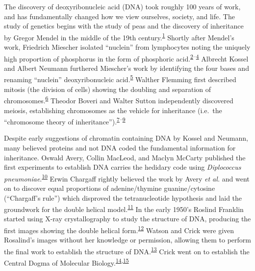 \documentclass[11pt,letterpaper]{book}
\begin{document}
The discovery of deoxyribonucleic acid (DNA) took roughly 100 years of work, and has fundamentally changed how we view ourselves, society, and life.
The study of genetics begins with the study of peas and the discovery of inheritance by Gregor Mendel in the middle of the 19th century.\textsuperscript{\protect\hyperlink{ref-mendel:1866aa}{1}}
Shortly after Mendel's work, Friedrich Miescher isolated ``nuclein'' from lymphocytes noting the uniquely high proportion of phosphorus in the form of phosphoric acid.\textsuperscript{\protect\hyperlink{ref-miescher:1871aa}{2}--\protect\hyperlink{ref-miescher:1874ab}{4}}
Albrecht Kossel and Albert Neumann furthered Miescher's work by identifying the four bases and renaming ``nuclein'' deoxyribonucleic acid.\textsuperscript{\protect\hyperlink{ref-kossel:1893aa}{5}}
Walther Flemming first described mitosis (the division of cells) showing the doubling and separation of chromosomes.\textsuperscript{\protect\hyperlink{ref-flemming:1878aa}{6}}
Theodor Boveri and Walter Sutton independently discovered meiosis, establishing chromosomes as the vehicle for inheritance (i.e.~the ``chromosome theory of inheritance'').\textsuperscript{\protect\hyperlink{ref-boveri:1902aa}{7}--\protect\hyperlink{ref-sutton:1903aa}{9}}

Despite early suggestions of chromatin containing DNA by Kossel and Neumann, many believed proteins and not DNA coded the fundamental information for inheritance.
Oswald Avery, Collin MacLeod, and Maclyn McCarty published the first experiments to establish DNA carries the hedidary code using \emph{Diplococcus pneumoniae}.\textsuperscript{\protect\hyperlink{ref-avery:1944aa}{10}}
Erwin Chargaff rightly believed the work by Avery \emph{et al.} and went on to discover equal proportions of adenine/thymine guanine/cytosine (``Chargaff's rule'') which disproved the tetranucleotide hypothesis and laid the groundwork for the double helical model.\textsuperscript{\protect\hyperlink{ref-chargaff:1949aa}{11}}
In the early 1950's Roslind Franklin started using X-ray crystallography to study the structure of DNA, producing the first images showing the double helical form.\textsuperscript{\protect\hyperlink{ref-franklin:1953aa}{12}}
Watson and Crick were given Rosalind's images without her knowledge or permission, allowing them to perform the final work to establish the structure of DNA.\textsuperscript{\protect\hyperlink{ref-watson:1953aa}{13}}
Crick went on to establish the Central Dogma of Molecular Biology.\textsuperscript{\protect\hyperlink{ref-crick:1958aa}{14},\protect\hyperlink{ref-crick:1970aa}{15}}
\end{document}
